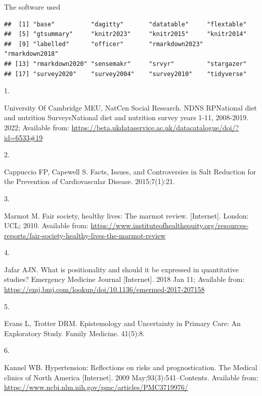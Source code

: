 \documentclass[
]{article}
\newlength{\cslhangindent}
\newlength{\csllabelwidth}
\newlength{\cslentryspacingunit} %
\newenvironment{CSLReferences}[2] %
 {%
  \setlength{\parindent}{0pt}
  \ifodd #1
  \let\oldpar\par
  \def\par{\hangindent=\cslhangindent\oldpar}
  \fi
  \setlength{\parskip}{#2\cslentryspacingunit}
 }%
 {}
\newcommand{\CSLLeftMargin}[1]{\parbox[t]{\csllabelwidth}{#1}}
\newcommand{\CSLRightInline}[1]{\parbox[t]{\linewidth - \csllabelwidth}{#1}\break}
\begin{document}
The software used

\begin{verbatim}
##  [1] "base"          "dagitty"       "datatable"     "flextable"    
##  [5] "gtsummary"     "knitr2023"     "knitr2015"     "knitr2014"    
##  [9] "labelled"      "officer"       "rmarkdown2023" "rmarkdown2018"
## [13] "rmarkdown2020" "sensemakr"     "srvyr"         "stargazer"    
## [17] "survey2020"    "survey2004"    "survey2010"    "tidyverse"
\end{verbatim}

\hypertarget{refs}{}
\begin{CSLReferences}{0}{0}
\leavevmode{}%
\CSLLeftMargin{1. }%
\CSLRightInline{University Of Cambridge MEU, NatCen Social Research.
NDNS RPNational diet and nutrition SurveysNational diet and nutrition
survey years 1-11, 2008-2019. 2022; Available from:
\url{https://beta.ukdataservice.ac.uk/datacatalogue/doi/?id=6533\#19}}

\leavevmode{}%
\CSLLeftMargin{2. }%
\CSLRightInline{Cappuccio FP, Capewell S. Facts, Issues, and
Controversies in Salt Reduction for the Prevention of Cardiovascular
Disease. 2015;7(1):21. }

\leavevmode{}%
\CSLLeftMargin{3. }%
\CSLRightInline{Marmot M. Fair society, healthy lives: The marmot
review. {[}Internet{]}. London: UCL; 2010. Available from:
\url{https://www.instituteofhealthequity.org/resources-reports/fair-society-healthy-lives-the-marmot-review}}

\leavevmode{}%
\CSLLeftMargin{4. }%
\CSLRightInline{Jafar AJN. What is positionality and should it be
expressed in quantitative studies? Emergency Medicine Journal
{[}Internet{]}. 2018 Jan 11; Available from:
\url{https://emj.bmj.com/lookup/doi/10.1136/emermed-2017-207158}}

\leavevmode{}%
\CSLLeftMargin{5. }%
\CSLRightInline{Evans L, Trotter DRM. Epistemology and Uncertainty in
Primary Care: An Exploratory Study. Family Medicine. 41(5):8. }

\leavevmode{}%
\CSLLeftMargin{6. }%
\CSLRightInline{Kannel WB. Hypertension: Reflections on risks and
prognostication. The Medical clinics of North America {[}Internet{]}.
2009 May;93(3):541--Contents. Available from:
\url{https://www.ncbi.nlm.nih.gov/pmc/articles/PMC3719976/}}


\end{CSLReferences}
\end{document}
